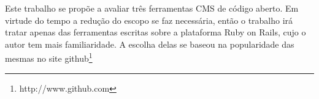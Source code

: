 Este trabalho se propõe a avaliar três ferramentas CMS de código aberto. Em virtude do tempo a redução do escopo se faz necessária, então o trabalho irá tratar apenas das ferramentas escritas sobre a plataforma Ruby on Rails, cujo o autor tem mais familiaridade. A escolha delas se baseou na popularidade das mesmas no site github\footnote{http://www.github.com}



        






